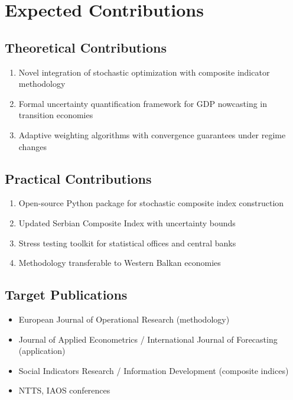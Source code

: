 \documentclass[12pt,a4paper]{article}
\begin{document}
\section{Expected Contributions}

\subsection{Theoretical Contributions}

\begin{enumerate}[leftmargin=*]
    \item Novel integration of stochastic optimization with composite indicator methodology
    \item Formal uncertainty quantification framework for GDP nowcasting in transition economies
    \item Adaptive weighting algorithms with convergence guarantees under regime changes
\end{enumerate}

\subsection{Practical Contributions}

\begin{enumerate}[leftmargin=*]
    \item Open-source Python package for stochastic composite index construction
    \item Updated Serbian Composite Index with uncertainty bounds
    \item Stress testing toolkit for statistical offices and central banks
    \item Methodology transferable to Western Balkan economies
\end{enumerate}

\subsection{Target Publications}

\begin{itemize}[leftmargin=*]
    \item European Journal of Operational Research (methodology)
    \item Journal of Applied Econometrics / International Journal of Forecasting (application)
    \item Social Indicators Research / Information Development (composite indices)
    \item NTTS, IAOS conferences
\end{itemize}
\end{document}
